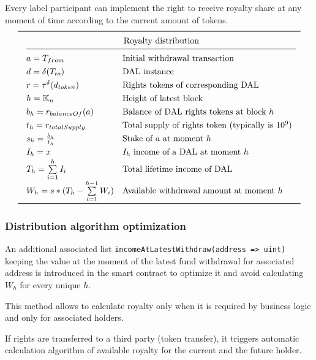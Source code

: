 \documentclass[12pt]{report}
\def\code#1{\colorbox{light-gray}{\texttt{#1}}}
\begin{document}
Every label participant can implement the right to receive royalty share at any moment of time according to the current amount of tokens.
\begin{equation}
\def\arraystretch{1.3}
\begin{array}{@{}llll@{}}
\toprule
    & \multicolumn{2}{c@{}}{\text{Royalty distribution}} & \\
\cmidrule(l){2-3}
    & a = T_{from} & \text{Initial withdrawal transaction} & \\
    & d = \delta(T_{to}) & \text{DAL instance} & \\
    & r = \tau^\delta(d_{token}) & \text{Rights tokens of corresponding DAL} & \\
    & h = \mathbb{K}_n & \text{Height of latest block} & \\
    & b_h = r_{balanceOf}(a) & \text{Balance of DAL rights tokens at block } h & \\
    & t_h = r_{totalSupply} & \text{Total supply of rights token (typically is } 10^9 \text{)} & \\
    & s_h = \frac{b_h}{t_h} & \text{Stake of } a \text{ at moment } h & \\
    & I_h = x & I_h \text{ income of a DAL at moment } h & \\
    & T_h = \sum\limits^{h}_{i=1} I_i & \text{Total lifetime income of DAL} & \\
    & W_h = s * (T_h - \sum\limits^{h-1}_{i=1} W_i) & \text{Available withdrawal amount at moment } h & \\
\bottomrule
\end{array}
\end{equation}
\subsubsection{Distribution algorithm optimization}
\label{tech-apps-dal-royalty-optimization}
An additional associated list  \code{incomeAtLatestWithdraw(address => uint)} keeping the value at the moment of the latest fund withdrawal for associated address is introduced in the smart contract  to optimize it and avoid calculating $W_h$ for every unique $h$.

This method allows to calculate royalty only when it is required by business logic and only for associated holders.

If rights are transferred to a third party (token transfer), it triggers automatic calculation algorithm of available royalty for the current and the future holder.
\end{document}
